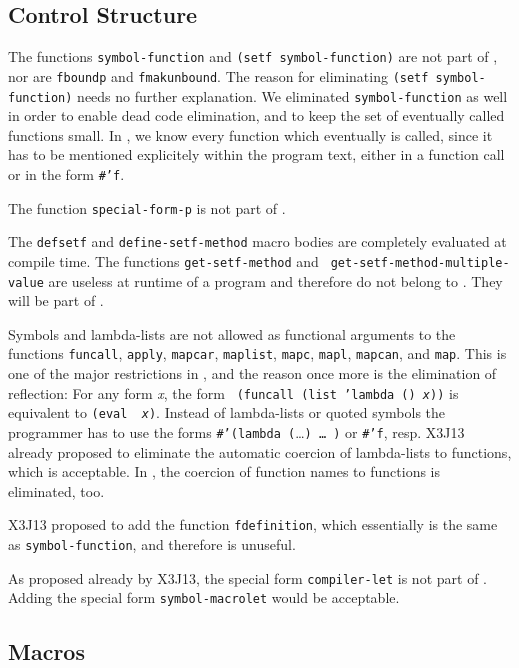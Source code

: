 \subsection{Control Structure}
\label{control}

The functions {\tt symbol-function} and {\tt (setf symbol-function)} are 
not part of , nor are {\tt fboundp} and {\tt fmakunbound}. The reason 
for eliminating {\tt (setf symbol-function)} needs no further explanation. 
We eliminated {\tt symbol-function} as well in order to enable dead code 
elimination, and to keep the set of eventually called functions small. In 
, we know every function which eventually is called, since it has to be 
mentioned explicitely within the program text, either in a function call or 
in the form {\tt \#'f}.

The function {\tt special-form-p} is not part of .

The {\tt defsetf} and {\tt define-setf-method} macro bodies are completely 
evaluated at compile time. The functions {\tt get-setf-method} and {\tt
get-setf-method-multiple-value} are useless at runtime of a program and 
therefore do not belong to . They will be part of \clm.

Symbols and lambda-lists are not allowed as functional arguments to
the functions {\tt funcall}, {\tt apply}, {\tt mapcar}, {\tt maplist},
{\tt mapc}, {\tt mapl}, {\tt mapcan}, and {\tt map}. This is one of
the major restrictions in , and the reason once more is the
elimination of reflection: For any form {\it x}, the form {\tt
(funcall (list 'lambda () {\it x}))} is equivalent to {\tt (eval {\it
x})}.  Instead of lambda-lists or quoted symbols the programmer has to
use the forms {\tt \#'(lambda (}\ldots{\tt) \ldots\ )} or {\tt \#'f},
resp.  X3J13 already proposed to eliminate the automatic coercion of
lambda-lists to functions, which is acceptable. In , the
coercion of function names to functions is eliminated, too.

X3J13 proposed to add the function {\tt fdefinition}, which
essentially is the same as {\tt symbol-function}, and therefore is
unuseful.

As proposed already by X3J13, the special form {\tt compiler-let} is not 
part of . Adding the special form {\tt symbol-macrolet} would be 
acceptable.

\subsection{Macros}
\label{macro}

